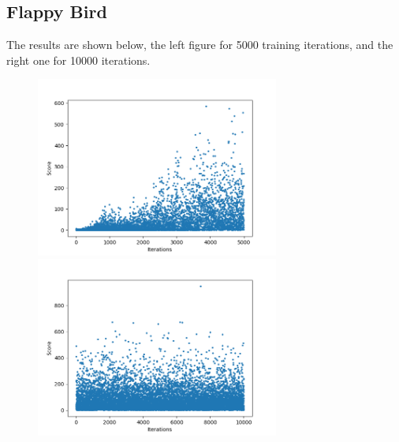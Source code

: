 \documentclass[a4paper, 11pt]{article}
\begin{document}
\subsection{Flappy Bird}
The results are shown below, the left figure for 5000 training iterations, and the right one for 10000 iterations.
\begin{figure}[H]
\centering
\includegraphics[width=8cm]{fig/result1.png}
\quad
\includegraphics[width=8cm]{fig/result2.png}
\end{figure}
\end{document}
